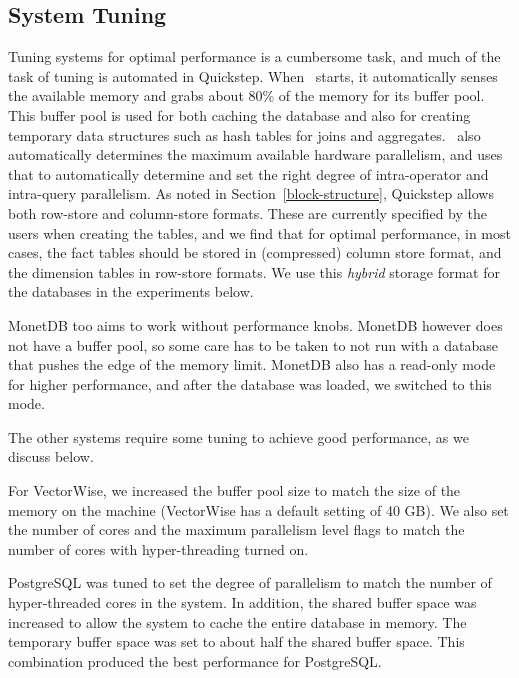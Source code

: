 \subsection{System Tuning} \label{exp-tuning}
Tuning systems for optimal performance is a cumbersome task, and much of the task of tuning is automated in Quickstep.
When \Quickstep\ starts, it automatically senses the available memory and grabs about 80\% of the memory for its buffer pool.
This buffer pool is used for both caching the database and also for creating temporary data structures such as hash tables for joins and aggregates. \Quickstep\ also automatically determines the maximum available hardware parallelism, and uses that to automatically determine and set the right degree of intra-operator and intra-query parallelism. As noted in Section~\ref{block-structure}, Quickstep allows both row-store and column-store formats. These are currently specified by the users when creating the tables, and we find that for optimal performance, in most cases, the fact tables should be  stored in (compressed) column store format, and the dimension tables in row-store formats. We use this \textit{hybrid} storage format for the databases in the experiments below.

MonetDB too aims to work without performance knobs. MonetDB however does not have a buffer pool, so some care has to be taken to not run with a database that pushes the edge of the memory limit. MonetDB also has a read-only mode for higher performance, and after the database was loaded, we switched to this mode.

The other systems require some tuning to achieve good performance, as we discuss below.

For VectorWise, we increased the buffer pool size to match the size of the memory on the machine (VectorWise has a default setting of 40 GB). We also set the number of cores and the maximum parallelism level flags to match the number of cores with hyper-threading turned on.

PostgreSQL was tuned to set the degree of parallelism to match the number of hyper-threaded cores in the system. In addition, the shared buffer space was increased to allow the system to cache the entire database in memory. The temporary buffer space was set to about half the shared buffer space. %
This combination produced the best performance for PostgreSQL. %

